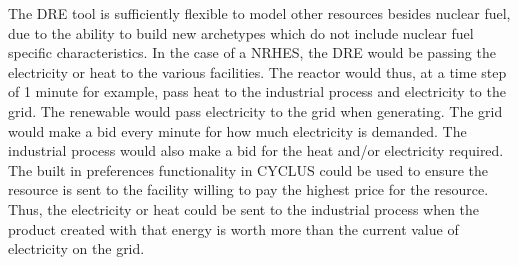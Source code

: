 \documentclass[12pt]{UIdahoMastersThesis}
\begin{document}
The DRE tool is sufficiently flexible to model other resources besides nuclear fuel, due to the ability to build new archetypes which do not include nuclear fuel specific characteristics.  In the case of a NRHES, the DRE would be passing the electricity or heat to the various facilities.  The reactor would thus, at a time step of 1 minute for example, pass heat to the industrial process and electricity to the grid.  The renewable would pass electricity to the grid when generating.  The grid would make a bid every minute for how much electricity is demanded.  The industrial process would also make a bid for the heat and/or electricity required.  The built in preferences functionality in CYCLUS could be used to ensure the resource is sent to the facility willing to pay the highest price for the resource.  Thus, the electricity or heat could be sent to the industrial process when the product created with that energy is worth more than the current value of electricity on the grid.
% 
% 


\end{document}

